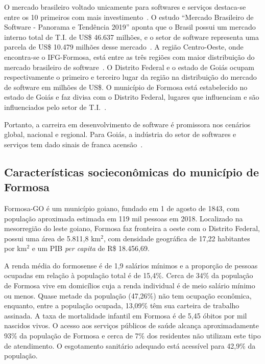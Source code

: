 \documentclass[11pt,fleqn]{book} %
\begin{document}
O mercado brasileiro voltado unicamente para softwares e serviços destaca-se entre os 10 primeiros com mais investimento~\cite{Abes2018}. 
O estudo ``Mercado Brasileiro de Software - Panorama e Tendência 2019'' aponta que o Brasil possui um mercado interno total de T.I. de US\$ 46.637 milhões, e o setor de software representa uma parcela de US\$ 10.479 milhões desse mercado~\cite{Abes2018}. 
A região Centro-Oeste, onde encontra-se o IFG-Formosa, está entre as três regiões com maior distribuição do mercado brasileiro de software~\cite{Abes2018}. 
O Distrito Federal e o estado de Goiás ocupam respectivamente o primeiro e terceiro lugar da região na distribuição do mercado de software em milhões de US\$.
O município de Formosa está estabelecido no estado de Goiás e faz divisa com o Distrito Federal, lugares que influenciam e são influenciados pelo setor de T.I.~\cite{Abes2018}.

Portanto, a carreira em desenvolvimento de software é promissora nos cenários global, nacional e regional. 
Para Goiás, a indústria do setor de softwares e serviços tem dado sinais de franca acensão~\cite{Empreendeder2017}. 

\subsection{Características socieconômicas do município de Formosa}

Formosa-GO é um município goiano, fundado em 1 de agosto de 1843, com população aproximada estimada em 119 mil pessoas em 2018. 
Localizado na mesorregião do leste goiano, Formosa faz fronteira a oeste com o Distrito Federal, possui uma área de 5.811,8 km$^2$, com densidade geográfica de 17,22 habitantes por km$^2$ e um PIB \textit{per capita} de R\$ 18.456,69. 

A renda média do formosense é de 1,9 salários mínimos e a proporção de pessoas ocupadas em relação à população total é de 15,4\%. 
Cerca de 34\% da população de Formosa vive em domicílios cuja a renda individual é de meio salário mínimo ou menos. 
Quase metade da população (47,26\%) não tem ocupação econômica, enquanto, entre a população ocupada, 13,09\% têm sua carteira de trabalho assinada.
A taxa de mortalidade infantil em Formosa é de 5,45 óbitos por mil nascidos vivos. 
O acesso aos serviços públicos de saúde alcança aproximadamente 93\%  da população de Formosa e cerca de 7\% dos residentes não utilizam este tipo de atendimento. 
O esgotamento sanitário adequado está acessível para 42,9\% da população.
\end{document}
